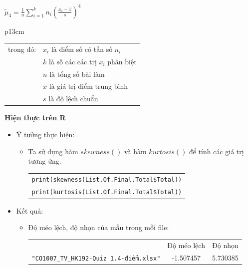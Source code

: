 \documentclass[a4paper]{article}
\theoremstyle{definition}
\begin{document}
\begin{enumerate}[a)]
\begin{itemize}
\begin{itemize}
            \begin{center}
                $\tilde{\mu}_4 = \frac{1}{n} \sum \limits_{i=1}^{k} n_i (\frac{x_i - \overline{x}}{s})^4$
                \begin{tabular}{p{13cm}}
                    \begin{tabular}{l l}
                        trong đó: & $x_i$ là điểm số có tần số $n_i$\\
                        & $k$ là số các các trị $x_i$ phân biệt\\
                        & $n$ là tổng số bài làm\\
                        & $\overline{x}$ là giá trị điểm trung bình\\
                        & $s$ là độ lệch chuẩn
                    \end{tabular}
                \end{tabular}
            \end{center}
        \end{itemize}
    \end{itemize}
    \bf Hiện thực trên R\normalfont
    \begin{itemize}
        \item Ý tưởng thực hiện:
        \begin{itemize}
            \item Ta sử dụng hàm $skewness()$ và hàm $kurtosis()$ để tính các giá trị tương ứng.
            \begin{center}
                \begin{tabular}{p{13cm}}
                    \texttt{print(skewness(List.Of.Final.Total\$Total))} \\
                    \texttt{print(kurtosis(List.Of.Final.Total\$Total))}
                \end{tabular}
            \end{center}
        \end{itemize}
        \item Kết quả:
        \begin{itemize}
            \item Độ méo lệch, độ nhọn của  mẫu trong mỗi file:
            \begin{center}
                \begin{tabular}{l c c}
                     & Độ méo lệch & Độ nhọn\\
                     \texttt{"CO1007\_TV\_HK192-Quiz 1.4-điểm.xlsx"} & -1.507457 & 5.730385\\

\end{tabular}
\end{center}
\end{itemize}
\end{itemize}
\end{enumerate}
\end{document}
